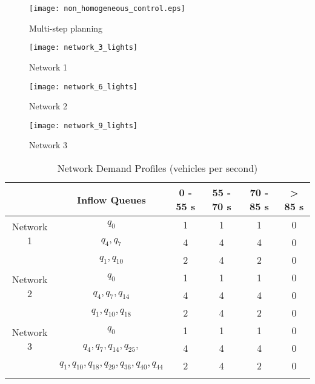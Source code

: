 \begin{figure*}[t!]
\centering
\texttt{[image: non\_homogeneous\_control.eps]}
\caption{Multi-step planning}
\label{fig:multiplan}
\end{figure*}


\begin{figure*}[t!]
\centering
\texttt{[image: network\_3\_lights]}
\caption{Network 1}
\label{fig:network1}
\end{figure*}

\begin{figure*}[t!]
\centering
\texttt{[image: network\_6\_lights]}
\caption{Network 2}
\label{fig:network2}
\end{figure*}

\begin{figure*}[t!]
\centering
\texttt{[image: network\_9\_lights]}
\caption{Network 3}
\label{fig:network3}
\end{figure*}


\begin{table}[h]
\caption{Network Demand Profiles (vehicles per second)}
\label{tab:network_demand}
\centering
\begin{tabular}{cccccc}
\toprule
& Inflow Queues & 0 - 55 s & 55 - 70 s & 70 - 85 s & > 85 s\\
\midrule
\multirow{2}{*}{Network 1}&$q_0$ & 1 & 1 & 1 & 0 \\
&$q_4, q_7$ & 4 & 4 & 4 & 0 \\
&$q_1,q_{10}$& 2 & 4 & 2 & 0 \\
\midrule
\multirow{2}{*}{Network 2}&$q_0$ & 1 & 1 & 1 & 0 \\
&$q_4,q_7,q_{14}$& 4 & 4 & 4 & 0 \\
&$q_1, q_{10},q_{18}$ & 2 & 4 & 2 & 0 \\
\midrule
\multirow{2}{*}{Network 3}&$q_0$ & 1 & 1 & 1 & 0 \\
&$q_4,q_7,q_{14},q_{25},$& 4 & 4 & 4 & 0 \\
&$q_1, q_{10},q_{18},q_{29},q_{36},q_{40},q_{44}$ & 2 & 4 & 2 & 0 \\
\bottomrule\\
\end{tabular}
\end{table}




